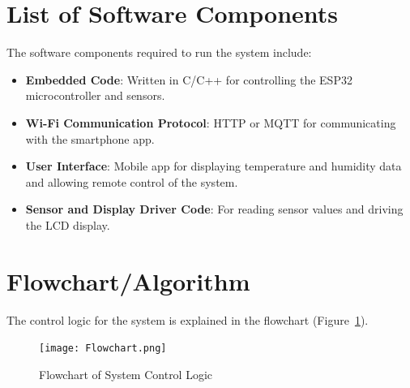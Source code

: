 \documentclass[a4paper,12pt]{article}
\begin{document}
\section{List of Software Components}
The software components required to run the system include:
\begin{itemize}
    \item \textbf{Embedded Code}: Written in C/C++ for controlling the ESP32 microcontroller and sensors.
    \item \textbf{Wi-Fi Communication Protocol}: HTTP or MQTT for communicating with the smartphone app.
    \item \textbf{User Interface}: Mobile app for displaying temperature and humidity data and allowing remote control of the system.
    \item \textbf{Sensor and Display Driver Code}: For reading sensor values and driving the LCD display.
\end{itemize}

\section{Flowchart/Algorithm}
The control logic for the system is explained in the flowchart (Figure~\ref{fig:flowchart}).

\begin{figure}[H]
    \centering
    \texttt{[image: Flowchart.png]} %
    \caption{Flowchart of System Control Logic}
    \label{fig:flowchart}
\end{figure}
\end{document}
